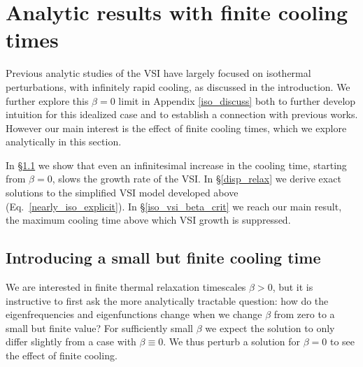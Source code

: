 \section{Analytic results with finite cooling times}\label{analytical}  

Previous analytic studies of the VSI have largely focused on isothermal
perturbations, with infinitely rapid cooling, as discussed in the introduction.  We further explore
this $\beta = 0$ limit in Appendix \ref{iso_discuss} both to further develop intuition for this 
idealized case and to establish a connection with previous 
works.  However our main interest is the effect of finite cooling times, which
we explore analytically in this section.  

In \S\ref{relax_pert} we show that even an infinitesimal increase in the cooling time,
starting from $\beta = 0$, slows the growth rate of the VSI.  In \S\ref{disp_relax} we 
derive exact solutions to the simplified VSI model developed above (Eq.\ \ref{nearly_iso_explicit}).
In \S\ref{iso_vsi_beta_crit} we reach our main result, the maximum cooling time above which 
VSI growth is suppressed.


%

\subsection{Introducing a small but finite
  cooling time}\label{relax_pert}
We are interested in finite thermal relaxation
timescales $\beta > 0$, but it is instructive to
first ask  the more analytically tractable question: how 
do the eigenfrequencies and eigenfunctions change when we change
$\beta$ from zero to a small but finite value? For 
sufficiently small $\beta$ we expect the solution to only differ
slightly from a case with $\beta\equiv 0$. We thus perturb a solution
for $\beta=0$ to see the effect of finite cooling.  

